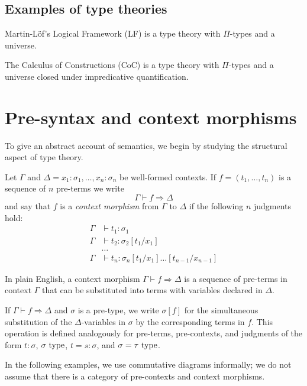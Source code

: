 \documentclass[a4paper]{article}
\begin{document}
\subsection{Examples of type theories}\label{sec:eott}

Martin-L\"of's Logical Framework (LF) is a type theory with $\Pi$-types and a universe.

The Calculus of Constructions (CoC) is a type theory with $\Pi$-types and a universe closed under impredicative quantification.

\section{Pre-syntax and context morphisms}\label{sec:pscm}

To give an abstract account of semantics, we begin by studying the structural aspect of type theory.

\begin{definition}[Hofmann]
  Let $\Gamma$ and $\Delta = x_1 : \sigma_1,\ldots,x_n : \sigma_n$ be well-formed contexts.
  If $f = (t_1,\ldots,t_n)$ is a sequence of $n$ pre-terms we write
  \[
    \Gamma \vdash f \Rightarrow \Delta
  \]
  and say that $f$ is a \emph{context morphism} from $\Gamma$ to $\Delta$ if the following $n$ judgments hold:
  \begin{align*}
    \Gamma &\vdash t_1 : \sigma_1\\
    \Gamma &\vdash t_2 : \sigma_2[t_1/x_1]\\
    &\ldots\\
    \Gamma &\vdash t_n : \sigma_n[t_1/x_1]\ldots[t_{n-1}/x_{n-1}]
  \end{align*}
\end{definition}

In plain English, a context morphism $\Gamma \vdash f \Rightarrow \Delta$ is a sequence of pre-terms in context $\Gamma$ that can be substituted into terms with variables declared in $\Delta$.

If $\Gamma \vdash f \Rightarrow \Delta$ and $\sigma$ is a pre-type, we write $\sigma[f]$ for the simultaneous substitution of the $\Delta$-variables in $\sigma$ by the corresponding terms in $f$.
This operation is defined analogously for pre-terms, pre-contexts, and judgments of the form $t : \sigma$, $\sigma~\mathrm{type}$, $t = s : \sigma$, and $\sigma = \tau~\mathrm{type}$.

In the following examples, we use commutative diagrams informally; we do not assume that there is a category of pre-contexts and context morphisms.
\end{document}
